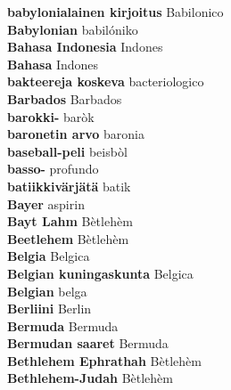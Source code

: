 \textbf{ babylonialainen kirjoitus  } Babilonico \\
\textbf{ Babylonian  } babilóniko \\
\textbf{ Bahasa Indonesia  } Indones \\
\textbf{ Bahasa  } Indones \\
\textbf{ bakteereja koskeva  } bacteriologico \\
\textbf{ Barbados  } Barbados \\
\textbf{ barokki-  } baròk \\
\textbf{ baronetin arvo  } baronia \\
\textbf{ baseball-peli  } beisbòl \\
\textbf{ basso-  } profundo \\
\textbf{ batiikkivärjätä  } batik \\
\textbf{ Bayer  } aspirin \\
\textbf{ Bayt Lahm  } Bètlehèm \\
\textbf{ Beetlehem  } Bètlehèm \\
\textbf{ Belgia  } Belgica \\
\textbf{ Belgian kuningaskunta  } Belgica \\
\textbf{ Belgian  } belga \\
\textbf{ Berliini  } Berlin \\
\textbf{ Bermuda  } Bermuda \\
\textbf{ Bermudan saaret  } Bermuda \\
\textbf{ Bethlehem Ephrathah  } Bètlehèm \\
\textbf{ Bethlehem-Judah  } Bètlehèm \\
